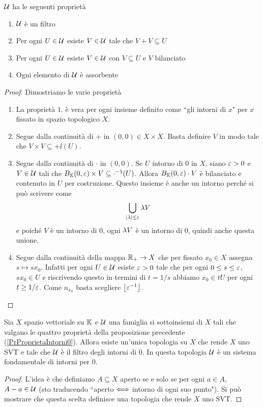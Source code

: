 \begin{proposition}\label{PrProprietaIntorni0}
$\mathcal{U}$ ha le seguenti propriet\`a
\begin{enumerate}
    \item $\mathcal{U}$ \`e un filtro
    \item Per ogni $U\in\mathcal{U}$ esiste $V\in\mathcal{U}$ tale che $V+V\subseteq U$
    \item Per ogni $U\in\mathcal{U}$ esiste $V\in\mathcal{U}$ con $V\subseteq U$ e $V$ bilanciato
    \item Ogni elemento di $\mathcal{U}$ \`e assorbente
\end{enumerate}
\end{proposition}
\begin{proof}
Dimostriamo le varie propriet\`a
\begin{enumerate}
    \item La propriet\`a $1.$ \`e vera per ogni insieme definito come ``gli intorni di $x$" per $x$ fissato in spazio topologico $X$.
    \item Segue dalla continuit\`a di $+$ in $(0,0)\in X\times X$. Basta definire $V$ in modo tale che $V\times V\subseteq +\ii(U)$.
    \item Segue dalla continuit\`a di $\cdot$ in $(0,0)$. Se $U$ intorno di $0$ in $X$, siano $\varepsilon>0$ e $V\in \mathcal{U}$ tali che $B_{\mathbb{K}}(0,\varepsilon)\times V\subseteq \cdot^{-1}(U)$. Allora $B_{\mathbb{K}}(0,\varepsilon)\cdot V$ \`e bilanciato e contenuto in $U$ per costruzione. Questo insieme \`e anche un intorno perch\'e si pu\`o scrivere come
    \[\bigcup_{\left|{\lambda}\right|\leq \varepsilon}\lambda V \]
    e poich\'e $V$ \`e un intorno di $0$, ogni $\lambda V$ \`e un intorno di $0$, quindi anche questa unione.
    \item Segue dalla continuit\`a della mappa $\mathbb{R}_+\to X$ che per fissato $x_0\in X$ assegna $s\mapsto sx_0$. Infatti per ogni $U\in\mathcal{U}$ esiste $\varepsilon>0$ tale che per ogni $0\leq s\leq \varepsilon$, $sx_0\in U$ e riscrivendo questo in termini di $t=1/s$ abbiamo $x_0\in tU$ per ogni $t\geq 1/\varepsilon$. Come $n_{x_0}$ basta scegliere $\left\lfloor {\varepsilon^{-1}}\right\rfloor$.
\end{enumerate}
\end{proof}

\begin{exercise}\label{ExTopologiaIndottaDaIntorniDi0}
Sia $X$ spazio vettoriale su $\mathbb{K}$ e $\mathcal{U}$ una famiglia si sottoinsiemi di $X$ tali che valgano le quattro propriet\`a della proposizione precedente (\ref{PrProprietaIntorni0}). Allora esiste un'unica topologia su $X$ che rende $X$ uno SVT e tale che $\mathcal{U}$ \`e il filtro degli intorni di $0$. In questa topologia $\mathcal{U}$ \`e un sistema fondamentale di intorni per $0$.
\end{exercise}
\begin{proof}
L'idea \`e che definiamo $A\subseteq X$ aperto se e solo se per ogni $a\in A$, $A-a\in\mathcal{U}$ (sto traducendo ``aperto $\Longleftrightarrow$ intorno di ogni suo punto"). Si pu\`o mostrare che questa scelta definisce una topologia che rende $X$ uno SVT.
\end{proof}


